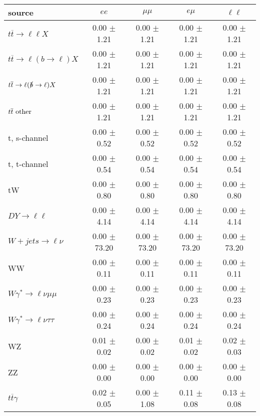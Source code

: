\begin{tabular}{l|cccc} \hline\hline
source & $ee$ & $\mu\mu$ & $e\mu$ & $\ell\ell $ \\
\hline
$t\overline{t} \rightarrow \ell \ell X$ &  0.00 $\pm$  1.21 &  0.00 $\pm$  1.21 &  0.00 $\pm$  1.21 &  0.00 $\pm$  1.21 \\
$t\overline{t} \rightarrow \ell (b \rightarrow \ell) X$ &  0.00 $\pm$  1.21 &  0.00 $\pm$  1.21 &  0.00 $\pm$  1.21 &  0.00 $\pm$  1.21 \\
$t\overline{t} \rightarrow \ell (\slashed b \rightarrow \ell) X$ &  0.00 $\pm$  1.21 &  0.00 $\pm$  1.21 &  0.00 $\pm$  1.21 &  0.00 $\pm$  1.21 \\
        $t\overline{t}\ \rm{other}$ &  0.00 $\pm$  1.21 &  0.00 $\pm$  1.21 &  0.00 $\pm$  1.21 &  0.00 $\pm$  1.21 \\
\hline
                       t, s-channel &  0.00 $\pm$  0.52 &  0.00 $\pm$  0.52 &  0.00 $\pm$  0.52 &  0.00 $\pm$  0.52 \\
                       t, t-channel &  0.00 $\pm$  0.54 &  0.00 $\pm$  0.54 &  0.00 $\pm$  0.54 &  0.00 $\pm$  0.54 \\
                                 tW &  0.00 $\pm$  0.80 &  0.00 $\pm$  0.80 &  0.00 $\pm$  0.80 &  0.00 $\pm$  0.80 \\
\hline
         $DY \rightarrow \ell \ell$ &  0.00 $\pm$  4.14 &  0.00 $\pm$  4.14 &  0.00 $\pm$  4.14 &  0.00 $\pm$  4.14 \\
      $W+jets \rightarrow \ell \nu$ &  0.00 $\pm$ 73.20 &  0.00 $\pm$ 73.20 &  0.00 $\pm$ 73.20 &  0.00 $\pm$ 73.20 \\
                                 WW &  0.00 $\pm$  0.11 &  0.00 $\pm$  0.11 &  0.00 $\pm$  0.11 &  0.00 $\pm$  0.11 \\
\hline
$W\gamma^{*} \rightarrow \ell \nu \mu\mu$ &  0.00 $\pm$  0.23 &  0.00 $\pm$  0.23 &  0.00 $\pm$  0.23 &  0.00 $\pm$  0.23 \\
$W\gamma^{*} \rightarrow \ell \nu \tau\tau$ &  0.00 $\pm$  0.24 &  0.00 $\pm$  0.24 &  0.00 $\pm$  0.24 &  0.00 $\pm$  0.24 \\
                                 WZ &  0.01 $\pm$  0.02 &  0.00 $\pm$  0.02 &  0.01 $\pm$  0.02 &  0.02 $\pm$  0.03 \\
                                 ZZ &  0.00 $\pm$  0.00 &  0.00 $\pm$  0.00 &  0.00 $\pm$  0.00 &  0.00 $\pm$  0.00 \\
\hline
              $t\overline{t}\gamma$ &  0.02 $\pm$  0.05 &  0.00 $\pm$  1.08 &  0.11 $\pm$  0.08 &  0.13 $\pm$  0.08 \\

\end{tabular}
